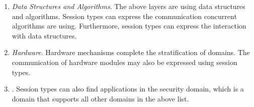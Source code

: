 \begin{enumerate}
	\item	{\em Data Structures and Algorithms}.
	The above layers are using data structures and algorithms.
	Session types can express the communication
	concurrent algorithms are using. Furthermore, session types
	can express the interaction with data structures.
	
	\item	{\em Hardware}.
	Hardware mechanisms complete the stratification of domains.
	The communication of hardware modules may also be expressed
	using session types.
	
	\item	{}.
	Session types can also find applications in the security domain,
	which is a domain that supports all other domains in the above list.
\end{enumerate}
